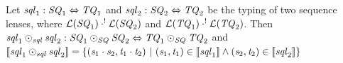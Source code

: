 \documentclass[numbers]{sigplanconf}
\begin{document}
\begin{lemma}
  Let $\mathit{sql}_1 : \mathit{SQ}_1 \Leftrightarrow \mathit{TQ}_1$ and
  $\mathit{sql}_2 : \mathit{SQ}_2 \Leftrightarrow \mathit{TQ}_2$ be the typing of
  two sequence lenses, where
  $\mathcal{L}(\mathit{SQ}_1) \cdot^! \mathcal{L}(\mathit{SQ}_2)$ and
  $\mathcal{L}(\mathit{TQ}_1) \cdot^! \mathcal{L}(\mathit{TQ}_2)$.
  Then $\mathit{sql}_1\odot_{\mathit{sql}}\mathit{sql}_2 :
  \mathit{SQ}_1\odot_{\mathit{SQ}}\mathit{SQ}_2 \Leftrightarrow
  \mathit{TQ}_1\odot_{\mathit{SQ}}\mathit{TQ}_2$ and
  $[ \! [\mathit{sql}_1\odot_{\mathit{sql}}\mathit{sql}_2] \! ] =
  \{(\mathit{s}_1\cdot\mathit{s}_2,\mathit{t}_1\cdot\mathit{t}_2) ~|~
    (\mathit{s}_1,\mathit{t}_1)\in[ \! [\mathit{sql}_1] \! ]
    \wedge(\mathit{s}_2,\mathit{t}_2)\in[ \! [\mathit{sql}_2] \! ]\}$
\end{lemma}
\end{document}
